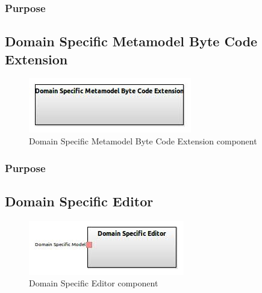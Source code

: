 \documentclass{gemoc} %
\begin{document}
\subsubsection{Purpose}



\subsection{Domain Specific Metamodel Byte Code Extension}

\begin{figure}[htp]
	\begin{center}
	\includegraphics*[trim=0.0cm 0.0cm 0cm 0.0cm, clip=true, scale=1.0]{../images/generated/Generated_Domain Specific Metamodel Byte Code Extension.jpg}
	\caption{Domain Specific Metamodel Byte Code Extension component}
	\end{center}
\end{figure}

\subsubsection{Purpose}



\subsection{Domain Specific Editor}

\begin{figure}[htp]
	\begin{center}
	\includegraphics*[trim=0.0cm 0.0cm 0cm 0.0cm, clip=true, scale=1.0]{../images/generated/Generated_Domain Specific Editor.jpg}
	\caption{Domain Specific Editor component}
	\end{center}
\end{figure}
\end{document}

